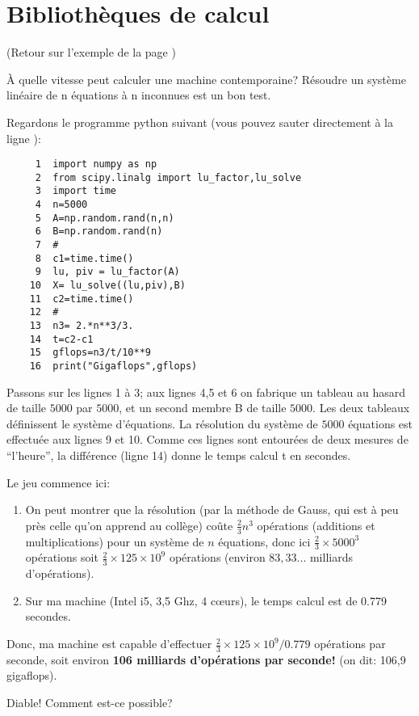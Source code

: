 \section{Bibliothèques de calcul}
(Retour sur l'exemple de la page \pageref{solve})\label{lu}

\`A quelle vitesse peut calculer une machine contemporaine? Résoudre
un système linéaire de n équations à n inconnues est un bon test.

Regardons le programme python suivant (vous pouvez sauter directement à
la ligne ):

\begin{verbatim}
     1	import numpy as np
     2	from scipy.linalg import lu_factor,lu_solve
     3	import time
     4	n=5000
     5	A=np.random.rand(n,n)
     6	B=np.random.rand(n)
     7	#
     8	c1=time.time()
     9	lu, piv = lu_factor(A)
    10	X= lu_solve((lu,piv),B)
    11	c2=time.time()
    12	#
    13	n3= 2.*n**3/3.
    14	t=c2-c1
    15	gflops=n3/t/10**9
    16	print("Gigaflops",gflops)    
\end{verbatim}
Passons sur les lignes 1 à 3; aux lignes 4,5 et 6 on fabrique un tableau
au hasard de taille $5000$ par $5000$, et un second membre B de taille
$5000$. Les deux tableaux définissent le système d'équations.
La résolution du système de  $5000$ équations est effectuée aux
lignes 9 et 10. Comme ces lignes  sont entourées de deux mesures de
``l'heure'', la différence (ligne 14) donne le temps calcul t en
secondes.

 Le jeu commence ici:
\begin{enumerate}
\item On peut montrer que la résolution (par la méthode de Gauss, qui
  est à peu près celle qu'on apprend au collège) \og coûte\fg{}
  $\frac{2}{3} n^3$ opérations (additions et multiplications) pour un
  système de $n$ équations, donc ici $\frac{2}{3} \times 5000^3$
  opérations soit
  $\frac{2}{3} \times 125 \times 10^9$ opérations (environ $83,33...$
  milliards d'opérations). 
\item Sur ma machine (Intel i5, 3,5 Ghz, 4 c{\oe}urs), le temps calcul est
  de 0.779 secondes.
\end{enumerate}

Donc, ma machine est capable d'effectuer $\frac{2}{3} \times 125 \times
  10^9/ 0.779$ opérations par seconde, soit environ \textbf{106
    milliards d'opérations par seconde!} (on dit: 106,9 gigaflops).

  Diable! Comment est-ce
  possible?

